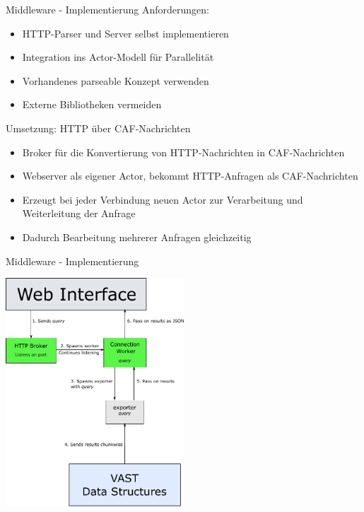 \documentclass[9pt]{beamer}
\begin{document}
\begin{frame}{Middleware - Implementierung}{}
	Anforderungen:
	\begin{itemize}
		\item HTTP-Parser und Server selbst implementieren
		\item Integration ins Actor-Modell für Parallelität
		\item Vorhandenes parseable Konzept verwenden
		\item Externe Bibliotheken vermeiden
	\end{itemize}
	Umsetzung: HTTP über CAF-Nachrichten
	\begin{itemize}
		\item Broker für die Konvertierung von HTTP-Nachrichten in CAF-Nachrichten
		\item Webserver als eigener Actor, bekommt HTTP-Anfragen als CAF-Nachrichten
		\item Erzeugt bei jeder Verbindung neuen Actor zur Verarbeitung und Weiterleitung der Anfrage
		\item Dadurch Bearbeitung mehrerer Anfragen gleichzeitig
	\end{itemize}
\end{frame}
\begin{frame}{Middleware - Implementierung}{}
	\begin{center}
		\includegraphics[width=0.5\textwidth]{res/swp_vast_detail.pdf}
	\end{center}
\end{frame}
\end{document}
